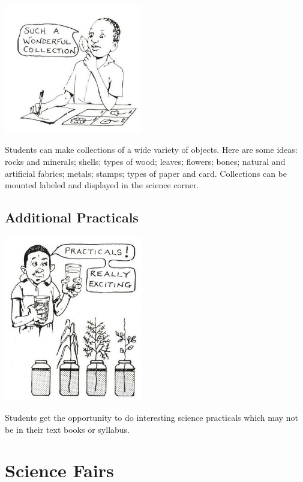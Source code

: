 \begin{multicols}{2}
\begin{center}
\includegraphics[width=0.45\textwidth]{./img/source/collections-research.jpg}
\end{center}

Students can make collections of a wide
variety of objects. Here are some ideas: rocks
and minerals; shells; types of wood; leaves;
flowers; bones; natural and artificial fabrics;
metals; stamps; types of paper and card.
Collections can be mounted labeled and
displayed in the science corner.

\subsection{Additional Practicals}

\begin{center}
\includegraphics[width=0.45\textwidth]{./img/source/extra-practicals.jpg}
\end{center}

Students get the opportunity to do interesting
science practicals which may not be in their text
books or syllabus.


\section{Science Fairs} 


\end{multicols}
